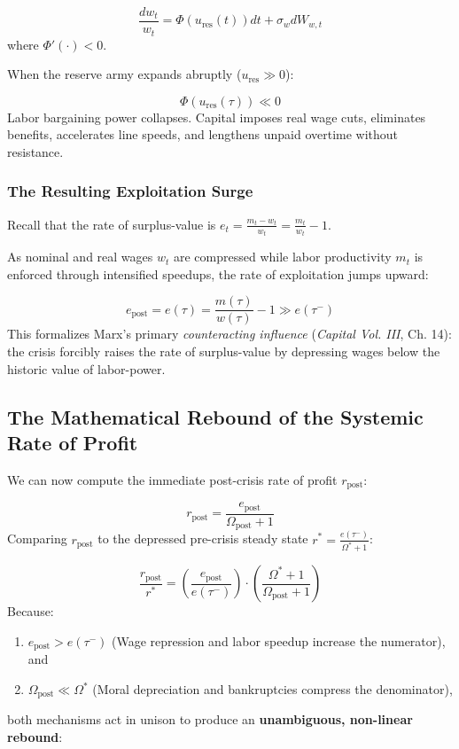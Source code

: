 \documentclass[11pt,letterpaper]{report}
\begin{document}
\[
\frac{d{w}_{t}}{{w}_{t}}=\Phi ({u}_{\mathrm{res}}(t))dt+{\sigma }_{w}d{W}_{w,t}
\]
where $\Phi '(\cdot )<0$.

When the reserve army expands abruptly (${u}_{\mathrm{res}}\gg 0$):

\[
\Phi ({u}_{\mathrm{res}}(\tau ))\ll 0
\]
Labor bargaining power collapses. Capital imposes real wage cuts, eliminates benefits, accelerates line speeds, and lengthens unpaid overtime without resistance.

\subsubsection{The Resulting Exploitation Surge}
Recall that the rate of surplus-value is ${e}_{t}=\frac{{m}_{t}-{w}_{t}}{{w}_{t}}=\frac{{m}_{t}}{{w}_{t}}-1$.

As nominal and real wages ${w}_{t}$ are compressed while labor productivity ${m}_{t}$ is enforced through intensified speedups, the rate of exploitation jumps upward:

\[
{e}_{\mathrm{post}}=e(\tau )=\frac{m(\tau )}{w(\tau )}-1\gg e({\tau }^{-})
\]
This formalizes Marx's primary \emph{counteracting influence} (\emph{Capital Vol. III}, Ch. 14): the crisis forcibly raises the rate of surplus-value by depressing wages below the historic value of labor-power.

\subsection{The Mathematical Rebound of the Systemic Rate of Profit}
We can now compute the immediate post-crisis rate of profit ${r}_{\mathrm{post}}$:

\[
{r}_{\mathrm{post}}=\frac{{e}_{\mathrm{post}}}{{\Omega }_{\mathrm{post}}+1}
\]
Comparing ${r}_{\mathrm{post}}$ to the depressed pre-crisis steady state ${r}^{*}=\frac{e({\tau }^{-})}{{\Omega }^{*}+1}$:

\[
\frac{{r}_{\mathrm{post}}}{{r}^{*}}=\left({\frac{{e}_{\mathrm{post}}}{e({\tau }^{-})}}\right)\cdot \left({\frac{{\Omega }^{*}+1}{{\Omega }_{\mathrm{post}}+1}}\right)
\]
Because:

\begin{enumerate}
\item ${e}_{\mathrm{post}}>e({\tau }^{-})$ (Wage repression and labor speedup increase the numerator), and
\item ${\Omega }_{\mathrm{post}}\ll {\Omega }^{*}$ (Moral depreciation and bankruptcies compress the denominator),
\end{enumerate}
both mechanisms act in unison to produce an \textbf{unambiguous, non-linear rebound}:
\end{document}
